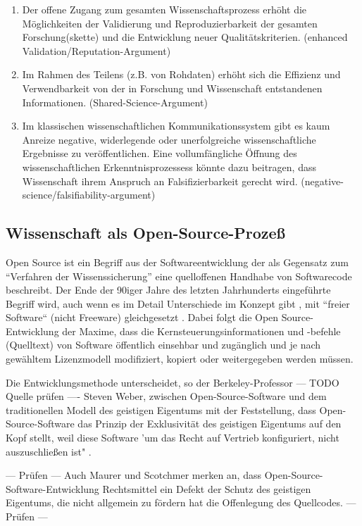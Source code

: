 \begin{enumerate}
\item Der offene Zugang zum gesamten Wissenschaftsprozess erhöht die Möglichkeiten der Validierung und Reproduzierbarkeit der gesamten Forschung(skette) und die Entwicklung neuer Qualitätskriterien. (enhanced Validation/Reputation-Argument)
\item Im Rahmen des Teilens (z.B. von Rohdaten) erhöht sich die Effizienz und Verwendbarkeit von der in Forschung und Wissenschaft entstandenen Informationen. (Shared-Science-Argument)
\item Im klassischen wissenschaftlichen Kommunikationssystem gibt es kaum Anreize negative, widerlegende oder unerfolgreiche wissenschaftliche Ergebnisse zu veröffentlichen. Eine vollumfängliche Öffnung des wissenschaftlichen Erkenntnisprozessess könnte dazu beitragen, dass Wissenschaft ihrem Anspruch an Falsifizierbarkeit gerecht wird. (negative-science/falsifiability-argument)
\end{enumerate}

\subsection{Wissenschaft als Open-Source-Prozeß}

Open Source ist ein Begriff aus der Softwareentwicklung der als Gegensatz zum “Verfahren der Wissenssicherung” \cite{stallman2002} eine quelloffenen Handhabe von Softwarecode beschreibt. Der Ende der 90iger Jahre des letzten Jahrhunderts eingeführte Begriff wird, auch wenn es im Detail Unterschiede im Konzept gibt \cite{suchen}, mit “freier Software“ (nicht Freeware) gleichgesetzt \cite{suchen}. Dabei folgt die Open Source-Entwicklung der Maxime, dass die Kernsteuerungsinformationen und -befehle (Quelltext) von Software öffentlich einsehbar und zugänglich und je nach gewähltem Lizenzmodell modifiziert, kopiert oder weitergegeben werden müssen\cite{suchen}. 

Die Entwicklungsmethode unterscheidet, so der Berkeley-Professor --- TODO Quelle prüfen ---- Steven Weber, zwischen Open-Source-Software und dem traditionellen Modell des geistigen Eigentums mit der Feststellung, dass Open-Source-Software das Prinzip der Exklusivität des geistigen Eigentums auf den Kopf stellt, weil diese Software 'um das Recht auf Vertrieb konfiguriert, nicht auszuschließen ist" \cite{suchen}. 

--- Prüfen ---
Auch Maurer und Scotchmer merken an, dass Open-Source-Software-Entwicklung Rechtsmittel ein Defekt der Schutz des geistigen Eigentums, die nicht allgemein zu fördern hat die Offenlegung des Quellcodes. 
--- Prüfen ---

